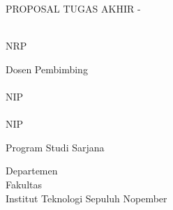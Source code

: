\begin{large}
  PROPOSAL TUGAS AKHIR - \coursecode{}
\end{large}

\vspace{\fill}

\begin{spacing}{1.5}
  \begin{Large}
    \tatitle{}
  \end{Large}
\end{spacing}

\vspace{\fill}

\begin{large}
  \name{} \\
  \textmd{NRP \nrp{}}
\end{large}

\vspace{\fill}

\begin{large}
  \textmd{Dosen Pembimbing} \\
  \advisor{} \\
  \textmd{NIP \advisornip{}} \\
  \coadvisor{} \\
  \textmd{NIP \coadvisornip{}} \\
\end{large}

\vspace{\fill}

Program Studi Sarjana \studyprogram{} \\

\mdseries

Departemen \department{} \\
Fakultas \faculty{} \\
Institut Teknologi Sepuluh Nopember

\place{} \\
\the\year{}

